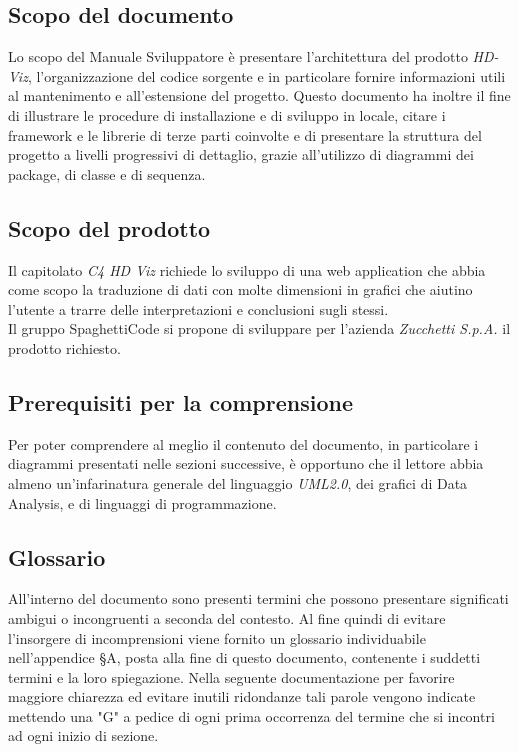 \documentclass[../manuale_sviluppatore.tex]{subfiles}
\begin{document}
\subsection{Scopo del documento}
\label{sub:scopo_doc}
Lo scopo del Manuale Sviluppatore è presentare l’architettura del prodotto \emph{HD-Viz}, l’organizzazione del codice sorgente e in particolare fornire informazioni utili al mantenimento e all’estensione del progetto. 
Questo documento ha inoltre il fine di  illustrare le procedure di installazione e di sviluppo in locale, citare i framework e le librerie di terze parti coinvolte e di presentare la struttura del progetto a livelli progressivi di dettaglio, grazie all’utilizzo di diagrammi dei package, di classe e di sequenza.

\subsection{Scopo del prodotto}
\label{sub:scopo_prod}
Il capitolato \emph{ C4 HD Viz} richiede lo sviluppo di una web application che abbia come scopo la traduzione di dati con molte dimensioni in grafici che aiutino l’utente a trarre delle interpretazioni e conclusioni sugli stessi. \\
Il gruppo SpaghettiCode si propone di sviluppare per l’azienda \emph{Zucchetti S.p.A.}  il prodotto richiesto.

\subsection{Prerequisiti per la comprensione}
\label{sub:prereq}
Per poter comprendere al meglio il contenuto del documento, in particolare i diagrammi
presentati nelle sezioni successive, è opportuno che il lettore abbia almeno un’infarinatura
generale del linguaggio \emph{UML2.0}, dei grafici di Data Analysis, e di linguaggi di programmazione.  

\subsection{Glossario}
\label{sub:glossario}
All’interno del documento sono presenti termini che possono presentare significati ambigui o incongruenti a seconda del contesto. 
Al fine quindi di evitare l’insorgere di incomprensioni viene fornito un glossario individuabile nell’appendice §A, posta alla fine di questo documento, contenente i suddetti termini e la loro spiegazione. 
Nella seguente documentazione per favorire maggiore chiarezza ed evitare inutili ridondanze tali parole vengono indicate mettendo una "G" a pedice di ogni prima occorrenza del termine che si incontri ad ogni inizio di sezione. 
\end{document}
